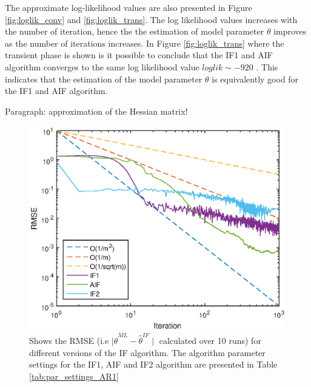 \documentclass[twoside,openright]{report}
\begin{document}
The approximate log-likelihood values are also presented in Figure \ref{fig:loglik_conv} and \ref{fig:loglik_trans}. The log likelihood values increases with the number of iteration, hence the the estimation of model parameter $\theta$ improves as the number of iterations increases. In Figure \ref{fig:loglik_trans} where the transient phase is shown is it possible to conclude that the IF1 and AIF algorithm converges to the same log likelihood value $loglik \sim -920$ . This indicates that the estimation of the model parameter $\theta$ is equivalently good for the IF1 and AIF algorithm.  

Paragraph: approximation of the Hessian matrix!

\begin{figure}[h]
  \centering
    \includegraphics[width=1\textwidth]{./fig_simple_AR1/conv_plot}
  \caption{Shows the RMSE (i.e $\mid \hat{\theta}^{ML} - \hat{\theta}^{IF}\mid$ calculated over 10 runs) for different versions of the IF algorithm. The algorithm parameter settings for the IF1, AIF and IF2 algorithm are presented in Table \ref{tab:par_settings_AR1}}
  \label{fig:conv_plot_AR1}
\end{figure}
\end{document}
